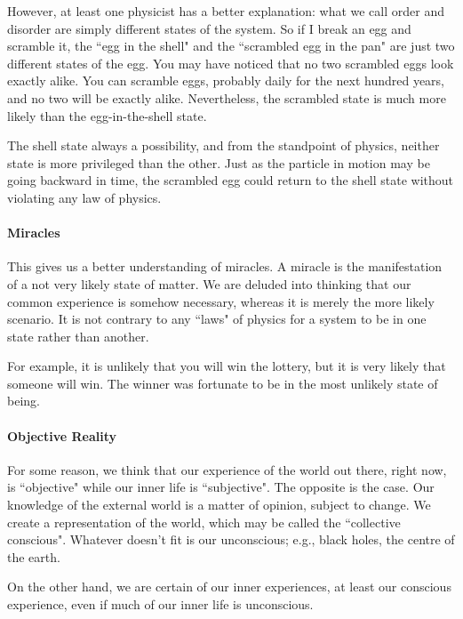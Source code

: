 However, at least one physicist has a better explanation: what we call order and disorder are simply different states of the system. So if I break an egg and scramble it, the ``egg in the shell" and the ``scrambled egg in the pan" are just two different states of the egg. You may have noticed that no two scrambled eggs look exactly alike. You can scramble eggs, probably daily for the next hundred years, and no two will be exactly alike. Nevertheless, the scrambled state is much more likely than the egg-in-the-shell state.

The shell state always a possibility, and from the standpoint of physics, neither state is more privileged than the other. Just as the particle in motion may be going backward in time, the scrambled egg could return to the shell state without violating any law of physics.

\paragraph{Miracles}
This gives us a better understanding of miracles. A miracle is the manifestation of a not very likely state of matter. We are deluded into thinking that our common experience is somehow necessary, whereas it is merely the more likely scenario. It is not contrary to any ``laws" of physics for a system to be in one state rather than another.

For example, it is unlikely that you will win the lottery, but it is very likely that someone will win. The winner was fortunate to be in the most unlikely state of being.

\paragraph{Objective Reality}

For some reason, we think that our experience of the world out there, right now, is ``objective" while our inner life is ``subjective". The opposite is the case. Our knowledge of the external world is a matter of opinion, subject to change. We create a representation of the world, which may be called the ``collective conscious". Whatever doesn't fit is our unconscious; e.g., black holes, the centre of the earth.

On the other hand, we are certain of our inner experiences, at least our conscious experience, even if much of our inner life is unconscious.


